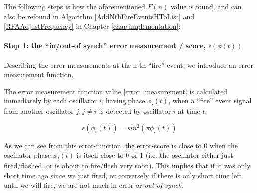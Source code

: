 	The following steps is how the aforementioned $F(n)$ value is found, and can also be refound in Algorithm \ref{AddNthFireEventsHToList} and \ref{RFAAdjustFrequency} in Chapter \ref{chap:implementation}:

		\paragraph{Step 1: the ``in/out-of synch'' error measurement / score, $\epsilon(\phi(t))$}

		Describing the error measurements at the n-th ``fire''-event, we introduce an error measurement function.

		The error measurement function value \eqref{error_measurement} is calculated immediately by each oscillator $i$, having phase $\phi_i(t)$, when a ``fire'' event signal from another oscillator $j, j \neq i$ is detected by oscillator $i$ at time $t$.

		\begin{equation}
		\label{error_measurement}
			\epsilon(\phi_i(t)) = sin^2(\pi\phi_i(t))
		\end{equation} \nl
		

		As we can see from this error-function, the error-score is close to 0 when the oscillator phase $\phi_i(t)$ is itself close to 0 or 1 (i.e. the oscillator either just fired/flashed, or is about to fire/flash very soon). This implies that if it was only short time ago since we just fired, or conversely if there is only short time left until we will fire, we are not much in error or \textit{out-of-synch}. 


